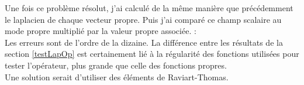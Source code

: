 Une fois ce problème résolut, j'ai calculé de la même manière que précédemment le laplacien de chaque vecteur propre. Puis j'ai comparé ce champ scalaire au mode propre multiplié par la valeur propre associée. :\\


Les erreurs sont de l'ordre de la dizaine. La différence entre les résultats de la section \ref{testLapOp} est certainement lié à la régularité des fonctions utilisées pour tester l'opérateur, plus grande que celle des fonctions propres.\\
Une solution serait d'utiliser des éléments de Raviart-Thomas.


